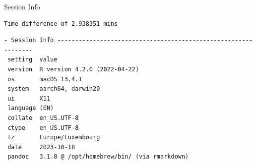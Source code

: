 \documentclass[
  ignorenonframetext,
  aspectratio=169,
]{beamer}
\begin{document}
\begin{frame}[fragile]{Session Info}
\protect\hypertarget{session-info}{}
\linespread{0.5}

\begin{verbatim}
Time difference of 2.938351 mins
\end{verbatim}

\linespread{2}

\linespread{0.5}

\begin{verbatim}
- Session info ---------------------------------------------------------------
 setting  value
 version  R version 4.2.0 (2022-04-22)
 os       macOS 13.4.1
 system   aarch64, darwin20
 ui       X11
 language (EN)
 collate  en_US.UTF-8
 ctype    en_US.UTF-8
 tz       Europe/Luxembourg
 date     2023-10-18
 pandoc   3.1.8 @ /opt/homebrew/bin/ (via rmarkdown)


\end{verbatim}
\end{frame}
\end{document}
